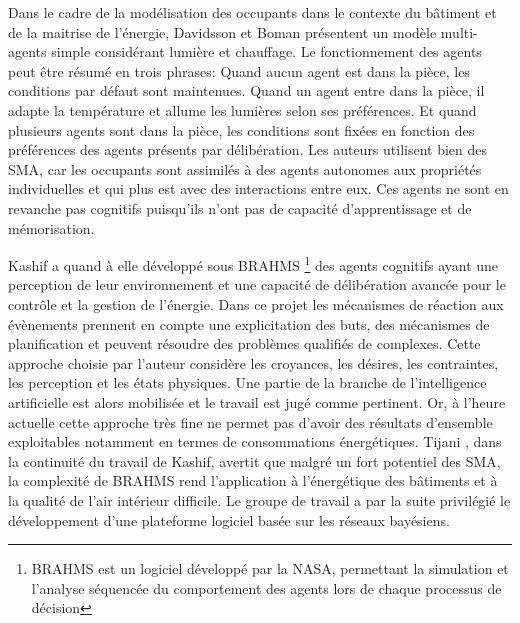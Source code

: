 Dans le cadre de la modélisation des occupants dans le contexte du bâtiment et de la maitrise de l'énergie, Davidsson et Boman \cite{Davidsson-05} présentent un modèle multi-agents simple considérant lumière et chauffage. Le fonctionnement des agents peut être résumé en trois phrases: Quand aucun agent est dans la pièce, les conditions par défaut sont maintenues. Quand un agent entre dans la pièce, il adapte la température et allume les lumières selon ses préférences. Et quand plusieurs agents sont dans la pièce, les conditions sont fixées en fonction des préférences des agents présents par délibération. Les auteurs utilisent bien des SMA, car les occupants sont assimilés à des agents autonomes aux propriétés individuelles et qui plus est avec des interactions entre eux. Ces agents ne sont en revanche pas cognitifs puisqu'ils n'ont pas de capacité d'apprentissage et de mémorisation.

Kashif \cite{Kashif-11} a quand à elle développé sous BRAHMS \footnote{BRAHMS est un logiciel développé par la NASA, permettant la simulation et l'analyse séquencée du comportement des agents lors de chaque processus de décision} des agents cognitifs ayant une perception de leur environnement et une capacité de délibération avancée pour le contrôle et la gestion de l'énergie. Dans ce projet les mécanismes de réaction aux évènements prennent en compte une explicitation des buts, des mécanismes de planification et peuvent résoudre des problèmes qualifiés de complexes. Cette approche choisie par l'auteur considère les croyances, les désires, les contraintes, les perception et les états physiques. Une partie de la branche de l'intelligence artificielle est alors mobilisée et le travail est jugé comme pertinent. Or, à l'heure actuelle cette approche très fine ne permet pas d'avoir des résultats d'ensemble exploitables notamment en termes de consommations énergétiques. Tijani \cite{Tijani-14}, dans la continuité du travail de Kashif, avertit que malgré un fort potentiel des SMA, la complexité de BRAHMS rend l'application à l'énergétique des bâtiments et à la qualité de l'air intérieur difficile. Le groupe de travail a par la suite privilégié le développement d'une plateforme logiciel basée sur les réseaux bayésiens. 

